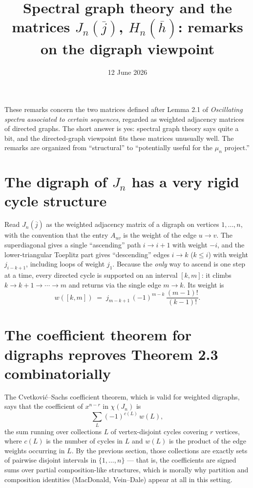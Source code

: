 \documentclass[11pt, fleqn]{amsart}
\title{Spectral graph theory and the matrices $J_n(\overline{j})$, $H_n(\overline{h})$:
remarks on the digraph viewpoint}
\date{12 June 2026}
\theoremstyle{remark}
\begin{document}
\maketitle

\noindent
These remarks concern the two matrices defined after Lemma 2.1 of
\emph{Oscillating spectra associated to certain sequences}, regarded as
weighted adjacency matrices of directed graphs. The short answer is yes:
spectral graph theory says quite a bit, and the directed-graph viewpoint
fits these matrices unusually well. The remarks are organized from
``structural'' to ``potentially useful for the $\mu_n$ project.''

\section{The digraph of $J_n$ has a very rigid cycle structure}

Read $J_n(\overline{j})$ as the weighted adjacency matrix of a digraph on
vertices $1,\dots,n$, with the convention that the entry $A_{uv}$ is the
weight of the edge $u\to v$. The superdiagonal gives a single
``ascending'' path $i \to i+1$ with weight $-i$, and the lower-triangular
Toeplitz part gives ``descending'' edges $i \to k$ ($k \le i$) with weight
$j_{i-k+1}$, including loops of weight $j_1$. Because the \emph{only} way
to ascend is one step at a time, every directed cycle is supported on an
interval $[k,m]$: it climbs $k \to k+1 \to \cdots \to m$ and returns via
the single edge $m \to k$. Its weight is
\begin{equation}\label{eq:cycleweight}
w([k,m]) \;=\; j_{m-k+1}\,(-1)^{m-k}\,\frac{(m-1)!}{(k-1)!}.
\end{equation}

\section{The coefficient theorem for digraphs reproves Theorem 2.3
combinatorially}

The Cvetkovi\'c--Sachs coefficient theorem, which is valid for weighted
digraphs, says that the coefficient of $x^{n-r}$ in $\chi(J_n)$ is
\[
\sum_{L} (-1)^{c(L)}\, w(L),
\]
the sum running over collections $L$ of vertex-disjoint cycles covering
$r$ vertices, where $c(L)$ is the number of cycles in $L$ and $w(L)$ is
the product of the edge weights occurring in $L$. By the previous
section, those collections are exactly sets of pairwise disjoint
intervals in $\{1,\dots,n\}$ --- that is, the coefficients are signed
sums over partial composition-like structures, which is morally why
partition and composition identities (MacDonald, Vein--Dale) appear at
all in this setting.
\end{document}
